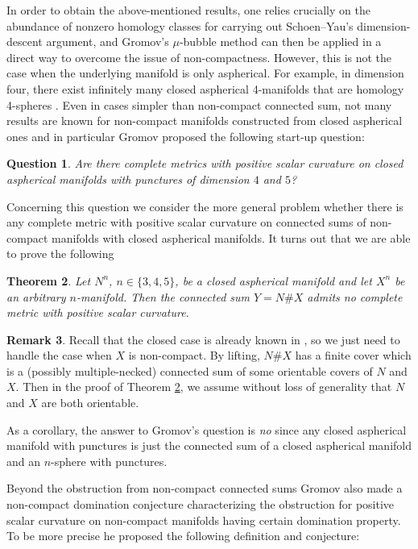 \documentclass[11pt,letterpaper]{amsart}
\numberwithin{equation}{section}
\newtheorem{theorem}{Theorem}[section]
\newtheorem{question}[theorem]{Question}
\theoremstyle{definition}
\newtheorem{remark}[theorem]{Remark}
\begin{document}
In order to obtain the above-mentioned results, one relies crucially on the abundance of nonzero homology classes for carrying out Schoen--Yau's dimension-descent argument, and Gromov's $\mu$-bubble method can then be applied in a direct way to overcome the issue of non-compactness. However, this is not the case when the underlying manifold is only aspherical. For example, in dimension four, there exist infinitely many closed aspherical 4-manifolds that are homology 4-spheres \cite{RT05}.  Even in cases simpler than non-compact connected sum, not many results are known for non-compact manifolds constructed from closed aspherical ones and in particular
Gromov \cite[p. 151]{Gro19} proposed the following start-up question:
\begin{question}
Are there complete metrics with positive scalar curvature on closed aspherical manifolds with punctures of dimension $4$ and $5$?
\end{question}
Concerning this question we consider the more general problem whether there is any complete metric with positive scalar curvature on connected sums of non-compact manifolds with closed aspherical manifolds. It turns out that we are able to prove the following

\begin{theorem}\label{Thm: main}
Let $N^n$, $n\in\{3,4,5\}$, be a closed aspherical manifold and let $X^n$ be an arbitrary $n$-manifold. Then the connected sum $Y= N \# X$ admits no complete metric with positive scalar curvature.
\end{theorem}

\begin{remark}\label{Rem: orientable}
Recall that the closed case is already known in \cite{CLL23}, so we just need to handle the case when $X$ is non-compact. By lifting, $N\#X$ has a finite cover which is a (possibly multiple-necked) connected sum of some orientable covers of $N$ and $X$. Then in the proof of Theorem \ref{Thm: main}, we assume without loss of generality that $N$ and $X$ are both orientable.
\end{remark}

As a corollary,
the answer to Gromov's question is \emph{no} since any closed aspherical manifold with punctures is just the connected sum of a closed aspherical manifold and an $n$-sphere with punctures.

Beyond the obstruction from non-compact connected sums Gromov \cite[p. 252]{Gro19} also made a non-compact domination conjecture characterizing the obstruction for positive scalar curvature on non-compact manifolds having certain domination property. To be more precise he proposed the following definition and conjecture:
\end{document}
